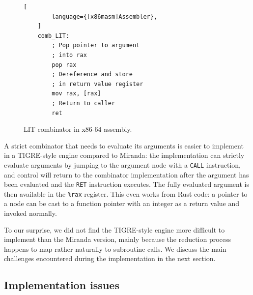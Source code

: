 \documentclass[conference]{IEEEtran}
\begin{document}
\begin{figure}
    \begin{lstlisting}[
        language={[x86masm]Assembler},
    ]
    comb_LIT:
        ; Pop pointer to argument
        ; into rax
        pop rax
        ; Dereference and store 
        ; in return value register
        mov rax, [rax]
        ; Return to caller
        ret
    \end{lstlisting}
    \centering
    \caption{LIT combinator in x86-64 assembly.}
    \label{fig:combLIT}
\end{figure}

A strict combinator that needs to evaluate its arguments is easier to implement in a TIGRE-style engine compared to Miranda: the implementation can strictly evaluate arguments by jumping to the argument node with a \texttt{CALL} instruction, and control will return to the combinator implementation after the argument has been evaluated and the \texttt{RET} instruction executes.
The fully evaluated argument is then available in the \texttt{\%rax} register.
This even works from Rust code: a pointer to a node can be cast to a function pointer with an integer as a return value and invoked normally.


To our surprise, we did not find the TIGRE-style engine more difficult to implement than the Miranda version, mainly because the reduction process happens to map rather naturally to subroutine calls.
We discuss the main challenges encountered during the implementation in the next section.

\subsection{Implementation issues}
\end{document}
